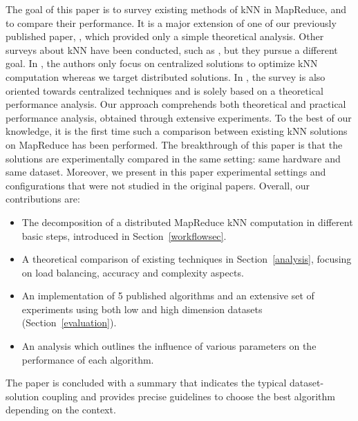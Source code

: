 The goal of this paper is to survey existing methods of kNN in MapReduce, and to compare their performance. It is a 
major extension of one of our previously published paper, \cite{song:hal-01097337}, which provided only a simple 
theoretical analysis. 
Other surveys about kNN have been conducted, such as \cite{SurveyNNTechniques,Jiang:2007:SIK:1302500.1303257}, but they 
pursue a different goal. In \cite{SurveyNNTechniques}, the authors 
only focus on centralized solutions to optimize kNN computation whereas we target distributed solutions. In 
\cite{Jiang:2007:SIK:1302500.1303257}, the 
survey is also oriented towards centralized techniques and is solely based on a theoretical performance analysis. Our 
approach comprehends both 
theoretical and practical performance analysis, obtained through extensive 
experiments. To the best of our knowledge, it is the first time such a comparison between existing kNN solutions on 
MapReduce has been performed. The breakthrough of this paper is that the solutions are experimentally compared in the 
same setting: same hardware and same dataset. 
Moreover, we present in this paper experimental settings and configurations that were not studied in the original 
papers.
Overall, our contributions are:
\begin{itemize}[noitemsep,nolistsep]
\item The decomposition of a distributed MapReduce kNN computation in different basic steps, introduced in Section~\ref{workflowsec}.
\item A theoretical comparison of existing techniques in Section~\ref{analysis}, focusing on load balancing, accuracy and complexity aspects.
\item An implementation of 5 published algorithms and an extensive set of experiments using both low and high dimension 
datasets (Section~\ref{evaluation}).
\item An analysis which outlines the influence of various parameters on the performance of each algorithm.
\end{itemize}
The paper is concluded with a summary that indicates the typical dataset-solution coupling and provides
precise guidelines to choose the best algorithm depending on the context.


